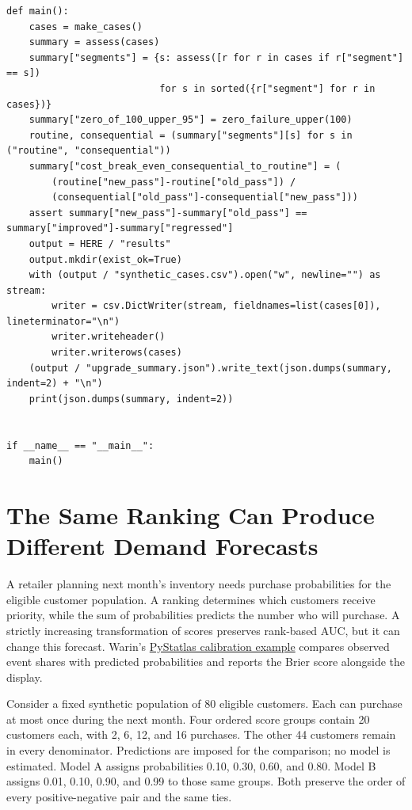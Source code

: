 \begin{Verbatim}[breaklines,breakanywhere,fontsize=\small]
def main():
    cases = make_cases()
    summary = assess(cases)
    summary["segments"] = {s: assess([r for r in cases if r["segment"] == s])
                           for s in sorted({r["segment"] for r in cases})}
    summary["zero_of_100_upper_95"] = zero_failure_upper(100)
    routine, consequential = (summary["segments"][s] for s in ("routine", "consequential"))
    summary["cost_break_even_consequential_to_routine"] = (
        (routine["new_pass"]-routine["old_pass"]) /
        (consequential["old_pass"]-consequential["new_pass"]))
    assert summary["new_pass"]-summary["old_pass"] == summary["improved"]-summary["regressed"]
    output = HERE / "results"
    output.mkdir(exist_ok=True)
    with (output / "synthetic_cases.csv").open("w", newline="") as stream:
        writer = csv.DictWriter(stream, fieldnames=list(cases[0]), lineterminator="\n")
        writer.writeheader()
        writer.writerows(cases)
    (output / "upgrade_summary.json").write_text(json.dumps(summary, indent=2) + "\n")
    print(json.dumps(summary, indent=2))


if __name__ == "__main__":
    main()
\end{Verbatim}

\hypertarget{M07-the-same-ranking-can-produce-different-demand-forecasts}{%
\section{The Same Ranking Can Produce Different Demand
Forecasts}\label{M07-the-same-ranking-can-produce-different-demand-forecasts}}

\noindent \noindent A retailer planning next month's inventory needs purchase
probabilities for the eligible customer population. A ranking determines
which customers receive priority, while the sum of probabilities
predicts the number who will purchase. A strictly increasing
transformation of scores preserves rank-based AUC, but it can change
this forecast. Warin's
\href{https://warint.github.io/pystatlas/model-diagnostics/calibration-plot/}{PyStatlas
calibration example} compares observed event shares with predicted
probabilities and reports the Brier score alongside the display.

Consider a fixed synthetic population of 80 eligible customers. Each can
purchase at most once during the next month. Four ordered score groups
contain 20 customers each, with 2, 6, 12, and 16 purchases. The other 44
customers remain in every denominator. Predictions are imposed for the
comparison; no model is estimated. Model A assigns probabilities 0.10,
0.30, 0.60, and 0.80. Model B assigns 0.01, 0.10, 0.90, and 0.99 to
those same groups. Both preserve the order of every positive-negative
pair and the same ties.

